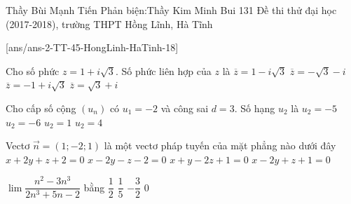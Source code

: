 
\begin{name}
{Thầy Bùi Mạnh Tiến 
	\newline Phản biện:Thầy Kim Minh Bui}
{131 Đề thi thử đại học (2017-2018), trường THPT Hồng Lĩnh, Hà Tĩnh}%
\end{name}
\setcounter{ex}{0}\setcounter{bt}{0}
[ans/ans-2-TT-45-HongLinh-HaTinh-18]
\begin{ex}%
	Cho số phức $z=1+i\sqrt{3}$. Số phức liên hợp của $z$ là
	\choice
	{\True $\overline{z}=1-i\sqrt{3}$}
	{$\overline{z}=-\sqrt{3}-i$}
	{$\overline{z}=-1+i\sqrt{3}$}
	{$\overline{z}=\sqrt{3}+i$}
\end{ex}
	
\begin{ex}%
	Cho cấp số cộng $\left(u_{n}\right)$ có $u_{1}=-2$ và công sai $d=3$. Số hạng $u_{2}$ là
	\choice
	{$u_{2}=-5$}
	{$u_{2}=-6$}
	{\True $u_{2}=1$}
	{$u_{2}=4$}
\end{ex}

\begin{ex}%
	Vectơ $\vec{n}=\left(1;-2;1\right)$ là một vectơ pháp tuyến của mặt phẳng nào dưới đây
	\choice
	{$x+2y+z+2=0$}
	{$x-2y-z-2=0$}
	{$x+y-2z+1=0$}
	{\True $x-2y+z+1=0$}
\end{ex}

\begin{ex}%
	$\lim\dfrac{n^2-3n^3}{2n^3+5n-2}$ bằng
	\choice
	{$\dfrac{1}{2}$}
	{$\dfrac{1}{5}$}
	{\True $-\dfrac{3}{2}$}
	{$0$}
\end{ex}

